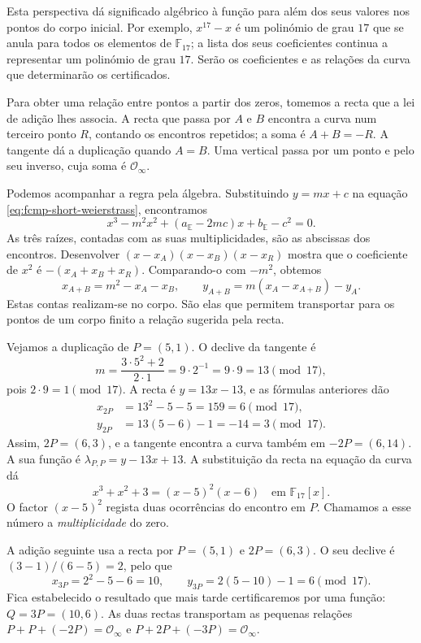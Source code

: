 Esta perspectiva dá significado algébrico à função para além dos seus
valores nos pontos do corpo inicial. Por exemplo, \(x^{17}-x\) é um
polinómio de grau \(17\) que se anula para todos os elementos de
\(\mathbb F_{17}\); a lista dos seus coeficientes continua a representar
um polinómio de grau \(17\). Serão os coeficientes e as relações da
curva que determinarão os certificados.


Para obter uma relação entre pontos a partir dos zeros, tomemos a
recta que a lei de adição lhes associa. A recta que passa por \(A\) e \(B\) encontra a curva num
terceiro ponto \(R\), contando os encontros repetidos; a soma é
\(A+B=-R\). A tangente dá a duplicação quando \(A=B\). Uma vertical
passa por um ponto e pelo seu inverso, cuja soma é
\(\mathcal O_\infty\).

Podemos acompanhar a regra pela álgebra. Substituindo \(y=mx+c\) na
equação \eqref{eq:fcmp-short-weierstrass}, encontramos
\[
 x^3-m^2x^2+(a_{\mathbb E}-2mc)x+b_{\mathbb E}-c^2=0.
\]
As três raízes, contadas com as suas multiplicidades, são as abscissas
dos encontros. Desenvolver
\((x-x_A)(x-x_B)(x-x_R)\) mostra que o coeficiente de \(x^2\) é
\(-(x_A+x_B+x_R)\). Comparando-o com \(-m^2\), obtemos
\[
 x_{A+B}=m^2-x_A-x_B,
 \qquad y_{A+B}=m(x_A-x_{A+B})-y_A.
\]
Estas contas realizam-se no corpo. São elas que permitem transportar
para os pontos de um corpo finito a relação sugerida pela recta.

Vejamos a duplicação de \(P=(5,1)\). O declive da tangente é
\[
 m=\frac{3\cdot5^2+2}{2\cdot1}
   =9\cdot2^{-1}=9\cdot9=13\pmod {17},
\]
pois \(2\cdot9=1\pmod {17}\). A recta é
\(y=13x-13\), e as fórmulas anteriores dão
\begin{align*}
 x_{2P}&=13^2-5-5=159=6\pmod {17},\\
 y_{2P}&=13(5-6)-1=-14=3\pmod {17}.
\end{align*}
Assim, \(2P=(6,3)\), e a tangente encontra a curva também em
\(-2P=(6,14)\). A sua função é \(\lambda_{P,P}=y-13x+13\).
A substituição da recta na equação da curva dá
\[
 x^3+x^2+3=(x-5)^2(x-6)\quad\text{em }\mathbb F_{17}[x].
\]
O factor \((x-5)^2\) regista duas ocorrências do encontro em \(P\).
Chamamos a esse número a \emph{multiplicidade} do zero.

A adição seguinte usa a recta por \(P=(5,1)\) e \(2P=(6,3)\).
O seu declive é \((3-1)/(6-5)=2\), pelo que
\[
 x_{3P}=2^2-5-6=10,
 \qquad y_{3P}=2(5-10)-1=6\pmod {17}.
\]
Fica estabelecido o resultado que mais tarde certificaremos por uma
função: \(Q=3P=(10,6)\). As duas rectas transportam as pequenas
relações \(P+P+(-2P)=\mathcal O_\infty\) e
\(P+2P+(-3P)=\mathcal O_\infty\).

